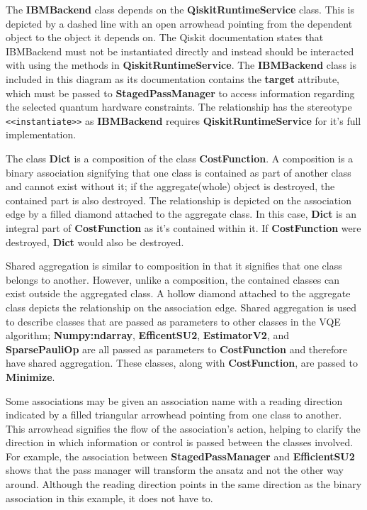 \documentclass{article}
\begin{document}
The \textbf{IBMBackend} class depends on the \textbf{QiskitRuntimeService} class. This is depicted by a dashed line with an open arrowhead pointing from the dependent object to the object it depends on. The Qiskit documentation states that IBMBackend must not be instantiated directly and instead should be interacted with using the methods in \textbf{QiskitRuntimeService}\cite{IBMBackend}. The \textbf{IBMBackend} class is included in this diagram as its documentation contains the \textbf{target} attribute, which must be passed to \textbf{StagedPassManager} to access information regarding the selected quantum hardware constraints. The relationship has the stereotype \texttt{<<instantiate>>} as \textbf{IBMBackend} requires \textbf{QiskitRuntimeService} for it's full implementation\cite{Dependencyrelationships}.

The class \textbf{Dict} is a composition of the class \textbf{CostFunction}. A composition is a binary association signifying that one class is contained as part of another class and cannot exist without it; if the aggregate(whole) object is destroyed, the contained part is also destroyed\cite{Seidl_Scholz_Huemer_Kappel_Duffy_2014}. The relationship is depicted on the association edge by a filled diamond attached to the aggregate class. In this case, \textbf{Dict} is an integral part of \textbf{CostFunction} as it's contained within it. If \textbf{CostFunction} were destroyed, \textbf{Dict} would also be destroyed.

Shared aggregation is similar to composition in that it signifies that one class belongs to another. However, unlike a composition, the contained classes can exist outside the aggregated class\cite{Seidl_Scholz_Huemer_Kappel_Duffy_2014}. A hollow diamond attached to the aggregate class depicts the relationship on the association edge. Shared aggregation is used to describe classes that are passed as parameters to other classes in the VQE algorithm; \textbf{Numpy:ndarray}, \textbf{EfficentSU2}, \textbf{EstimatorV2}, and \textbf{SparsePauliOp} are all passed as parameters to \textbf{CostFunction} and therefore have shared aggregation. These classes, along with \textbf{CostFunction}, are passed to \textbf{Minimize}.

Some associations may be given an association name with a reading direction indicated by a filled triangular arrowhead pointing from one class to another. This arrowhead signifies the flow of the association's action, helping to clarify the direction in which information or control is passed between the classes involved\cite{Seidl_Scholz_Huemer_Kappel_Duffy_2014}. For example, the association between \textbf{StagedPassManager} and \textbf{EfficientSU2} shows that the pass manager will transform the ansatz and not the other way around. Although the reading direction points in the same direction as the binary association in this example, it does not have to\cite{Seidl_Scholz_Huemer_Kappel_Duffy_2014}.
\end{document}
